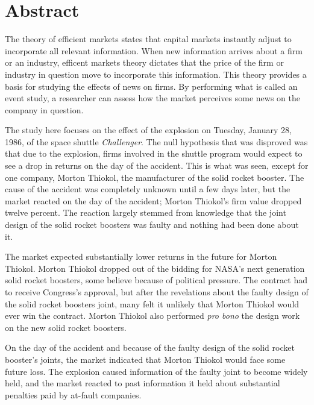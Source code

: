 \chapter*{Abstract}

The theory of efficient markets states that capital markets
instantly adjust to incorporate all relevant information. 
When new information arrives about a firm or an industry,
efficent markets theory dictates that the price of the firm
or industry in question move to incorporate this
information.  This theory provides a basis for studying the
effects of news on firms.  By performing what is called an
event study, a researcher can assess how the market
perceives some news on the company in question.

The study here focuses on the effect of the explosion on
Tuesday, January 28, 1986, of the space shuttle {\em
Challenger}.  The null hypothesis that was disproved was
that due to the explosion, firms involved in the shuttle
program would expect to see a drop in returns on the day of
the accident.  This is what was seen, except for one
company, Morton Thiokol, the manufacturer of the solid
rocket booster.  The cause of the accident was completely
unknown until a few days later, but the market reacted on
the day of the accident; Morton Thiokol's firm value dropped
twelve percent.  The reaction largely stemmed from knowledge
that the joint design of the solid rocket boosters was
faulty and nothing had been done about it.

The market expected substantially lower returns in the
future for Morton Thiokol.
Morton Thiokol dropped out of the bidding for
NASA's next generation solid rocket boosters, some believe
because of political pressure.
The contract had to receive Congress's approval, but after
the revelations about the faulty design of the solid rocket
boosters joint, many felt it unlikely that Morton Thiokol
would ever win the contract.
Morton Thiokol also performed {\em pro bono} the design work
on the new solid rocket boosters.

On the day of the accident and because of the faulty design
of the solid rocket booster's joints, the market indicated
that Morton Thiokol would face some future loss.
The explosion caused information of the faulty joint to
become widely held, and the market reacted to past information
it held about substantial penalties paid by at-fault
companies.
